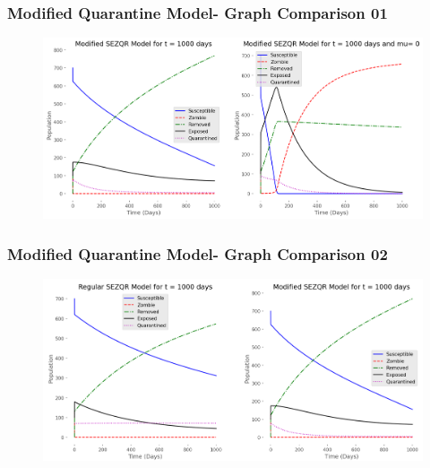 \documentclass{beamer}
\begin{document}
\begin{frame}
\begin{adjustwidth}{-1.7em}{-1.5em}
\frametitle{Modified Quarantine Model- Graph Comparison 01}

\begin{figure}[H]
\centering
\includegraphics[scale=0.41]{SEZQR_1.png}
\label{fig:SEZQR Model 02}
\end{figure}
\end{adjustwidth}
\end{frame}



\begin{frame}
\begin{adjustwidth}{-1.7em}{-1.5em}
\frametitle{Modified Quarantine Model- Graph Comparison 02}

\begin{figure}[H]
\centering
\includegraphics[scale=0.41]{Solution_Comparison.png}
\label{fig:SEZQR Model 03}
\end{figure}
\end{adjustwidth}
\end{frame}
\end{document}

